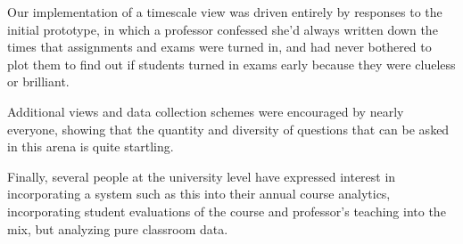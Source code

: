 Our implementation of a timescale view was driven entirely by responses to the initial prototype, in which a professor confessed she'd always written down the times that assignments and exams were turned in, and had never bothered to plot them to find out if students turned in exams early because they were clueless or brilliant. 

Additional views and data collection schemes were encouraged by nearly everyone, showing that the quantity  and diversity of questions that can be asked in this arena is quite startling. 

Finally, several people at the university level have  expressed interest in incorporating a system such as this into their annual course analytics, incorporating student evaluations of the course and professor's teaching into the mix, but analyzing pure classroom data.